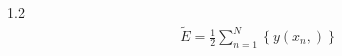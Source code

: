 \documentclass[a4j,11pt]{jarticle}
\begin{document}

\section{}
1.2 \\
\begin{eqnarray}
 \tilde{E} = \frac{1}{2} \sum_{n=1}^N
  \left \{
   y(x_n, )
  \right \}
\end{eqnarray}
\end{document}

